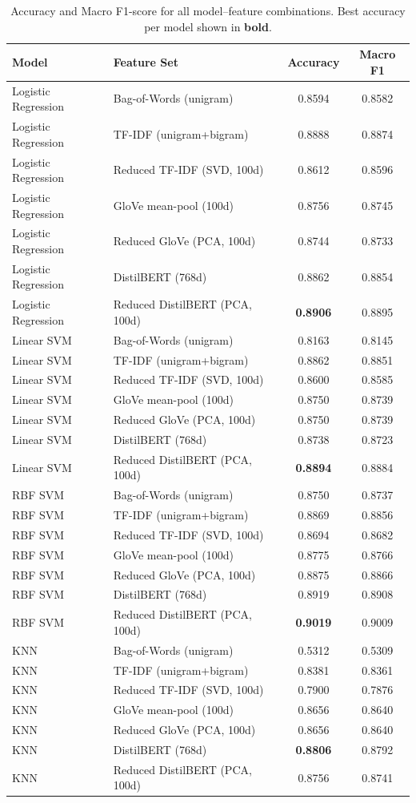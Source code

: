 \begin{table}[H]
\centering
\caption{Accuracy and Macro F1-score for all model--feature combinations. Best accuracy per model shown in \textbf{bold}.}
\label{tab:results}
\renewcommand{\arraystretch}{1.25}
\begin{tabular}{llcc}
\toprule
\textbf{Model} & \textbf{Feature Set} & \textbf{Accuracy} & \textbf{Macro F1} \\
\midrule
Logistic Regression & Bag-of-Words (unigram) & 0.8594 & 0.8582 \\
Logistic Regression & TF-IDF (unigram+bigram) & 0.8888 & 0.8874 \\
Logistic Regression & Reduced TF-IDF (SVD, 100d) & 0.8612 & 0.8596 \\
Logistic Regression & GloVe mean-pool (100d) & 0.8756 & 0.8745 \\
Logistic Regression & Reduced GloVe (PCA, 100d) & 0.8744 & 0.8733 \\
Logistic Regression & DistilBERT (768d) & 0.8862 & 0.8854 \\
Logistic Regression & Reduced DistilBERT (PCA, 100d) & \textbf{0.8906} & 0.8895 \\
\midrule
Linear SVM & Bag-of-Words (unigram) & 0.8163 & 0.8145 \\
Linear SVM & TF-IDF (unigram+bigram) & 0.8862 & 0.8851 \\
Linear SVM & Reduced TF-IDF (SVD, 100d) & 0.8600 & 0.8585 \\
Linear SVM & GloVe mean-pool (100d) & 0.8750 & 0.8739 \\
Linear SVM & Reduced GloVe (PCA, 100d) & 0.8750 & 0.8739 \\
Linear SVM & DistilBERT (768d) & 0.8738 & 0.8723 \\
Linear SVM & Reduced DistilBERT (PCA, 100d) & \textbf{0.8894} & 0.8884 \\
\midrule
RBF SVM & Bag-of-Words (unigram) & 0.8750 & 0.8737 \\
RBF SVM & TF-IDF (unigram+bigram) & 0.8869 & 0.8856 \\
RBF SVM & Reduced TF-IDF (SVD, 100d) & 0.8694 & 0.8682 \\
RBF SVM & GloVe mean-pool (100d) & 0.8775 & 0.8766 \\
RBF SVM & Reduced GloVe (PCA, 100d) & 0.8875 & 0.8866 \\
RBF SVM & DistilBERT (768d) & 0.8919 & 0.8908 \\
RBF SVM & Reduced DistilBERT (PCA, 100d) & \textbf{0.9019} & 0.9009 \\
\midrule
KNN & Bag-of-Words (unigram) & 0.5312 & 0.5309 \\
KNN & TF-IDF (unigram+bigram) & 0.8381 & 0.8361 \\
KNN & Reduced TF-IDF (SVD, 100d) & 0.7900 & 0.7876 \\
KNN & GloVe mean-pool (100d) & 0.8656 & 0.8640 \\
KNN & Reduced GloVe (PCA, 100d) & 0.8656 & 0.8640 \\
KNN & DistilBERT (768d) & \textbf{0.8806} & 0.8792 \\
KNN & Reduced DistilBERT (PCA, 100d) & 0.8756 & 0.8741 \\
\bottomrule
\end{tabular}
\end{table}